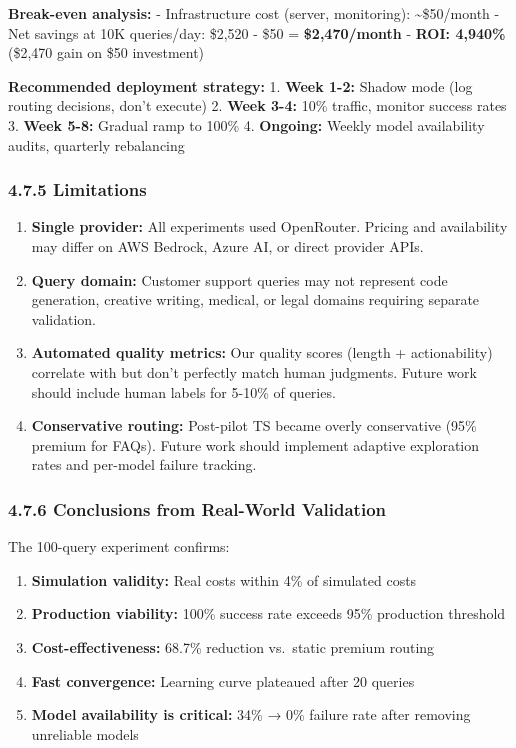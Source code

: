 \documentclass[
]{article}
\providecommand{\tightlist}{%
  \setlength{\itemsep}{0pt}\setlength{\parskip}{0pt}}
\begin{document}
\textbf{Break-even analysis:} - Infrastructure cost (server,
monitoring): \textasciitilde\$50/month - Net savings at 10K queries/day:
\$2,520 - \$50 = \textbf{\$2,470/month} - \textbf{ROI: 4,940\%} (\$2,470
gain on \$50 investment)

\textbf{Recommended deployment strategy:} 1. \textbf{Week 1-2:} Shadow
mode (log routing decisions, don't execute) 2. \textbf{Week 3-4:} 10\%
traffic, monitor success rates 3. \textbf{Week 5-8:} Gradual ramp to
100\% 4. \textbf{Ongoing:} Weekly model availability audits, quarterly
rebalancing

\hypertarget{limitations}{%
\subsubsection{4.7.5 Limitations}\label{limitations}}

\begin{enumerate}
\def\labelenumi{\arabic{enumi}.}
\item
  \textbf{Single provider:} All experiments used OpenRouter. Pricing and
  availability may differ on AWS Bedrock, Azure AI, or direct provider
  APIs.
\item
  \textbf{Query domain:} Customer support queries may not represent code
  generation, creative writing, medical, or legal domains requiring
  separate validation.
\item
  \textbf{Automated quality metrics:} Our quality scores (length +
  actionability) correlate with but don't perfectly match human
  judgments. Future work should include human labels for 5-10\% of
  queries.
\item
  \textbf{Conservative routing:} Post-pilot TS became overly
  conservative (95\% premium for FAQs). Future work should implement
  adaptive exploration rates and per-model failure tracking.
\end{enumerate}

\hypertarget{conclusions-from-real-world-validation}{%
\subsubsection{4.7.6 Conclusions from Real-World
Validation}\label{conclusions-from-real-world-validation}}

The 100-query experiment confirms:

\begin{enumerate}
\def\labelenumi{\arabic{enumi}.}
\tightlist
\item
  \textbf{Simulation validity:} Real costs within 4\% of simulated costs
\item
  \textbf{Production viability:} 100\% success rate exceeds 95\%
  production threshold
\item
  \textbf{Cost-effectiveness:} 68.7\% reduction vs.~static premium
  routing
\item
  \textbf{Fast convergence:} Learning curve plateaued after 20 queries
\item
  \textbf{Model availability is critical:} 34\% → 0\% failure rate after
  removing unreliable models
\end{enumerate}
\end{document}
